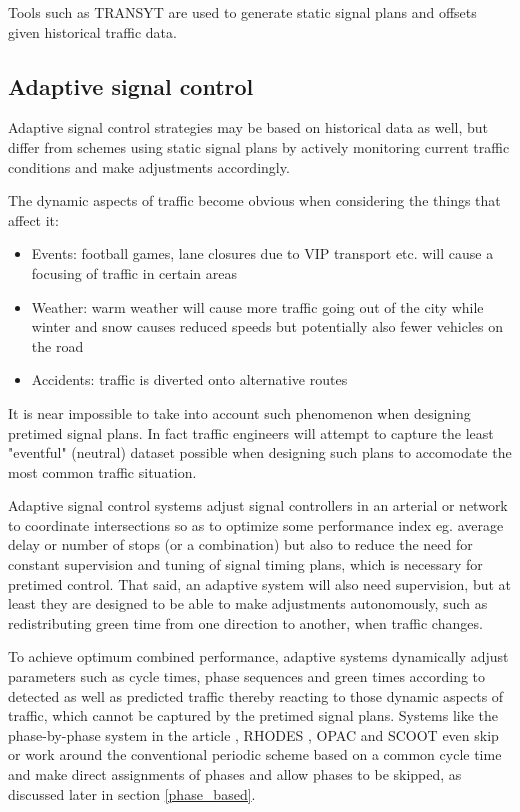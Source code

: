 Tools such as TRANSYT are used to generate static signal plans and offsets given historical traffic data.

\subsection{Adaptive signal control}
Adaptive signal control strategies may be based on historical data as well, but differ from schemes using static signal plans by actively monitoring current traffic conditions and make adjustments accordingly.

The dynamic aspects of traffic become obvious when considering the things that affect it:

\begin{itemize}
\item Events: football games, lane closures due to VIP transport etc. will cause a focusing of traffic in certain areas
\item Weather: warm weather will cause more traffic going out of the city while winter and snow causes reduced speeds but potentially also fewer vehicles on the road
\item Accidents: traffic is diverted onto alternative routes
\end{itemize}

It is near impossible to take into account such phenomenon when designing pretimed signal plans. In fact traffic engineers will attempt to capture the least "eventful" (neutral) dataset possible when designing such plans to accomodate the most common traffic situation.

Adaptive signal control systems adjust signal controllers in an arterial or network to coordinate intersections so as to optimize some performance index eg. average delay or number of stops (or a combination) but also to reduce the need for constant supervision and tuning of signal timing plans, which is necessary for pretimed control. That said, an adaptive system will also need supervision, but at least they are designed to be able to make adjustments autonomously, such as redistributing green time from one direction to another, when traffic changes.

To achieve optimum combined performance, adaptive systems dynamically adjust parameters such as cycle times, phase sequences and green times according to detected as well as predicted traffic thereby reacting to those dynamic aspects of traffic, which cannot be captured by the pretimed signal plans. Systems like the phase-by-phase system in the article \cite{phase_by_phase}, RHODES \cite{rhodes}, OPAC \cite{opac} and SCOOT \cite{scoot} even skip or work around the conventional periodic scheme based on a common cycle time and make direct assignments of phases and allow phases to be skipped, as discussed later in section \ref{phase_based}. 

